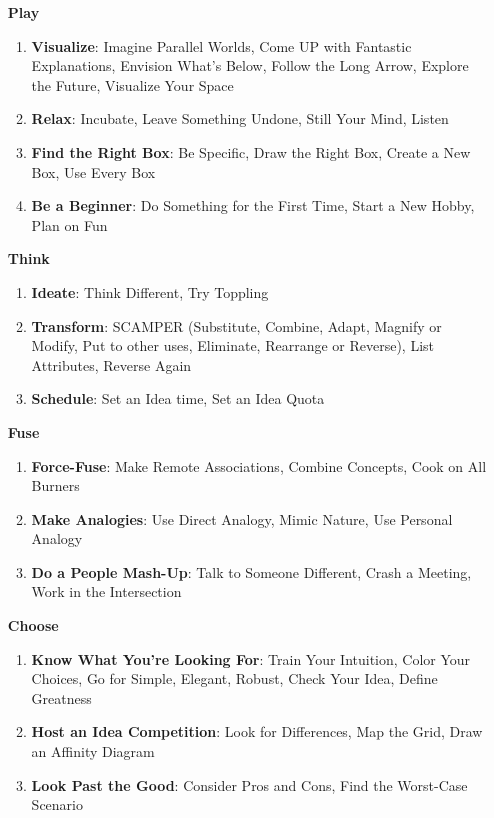 \documentclass[11pt, oneside]{article}   	%
\begin{document}
\begin{enumerate}
\begin{enumerate}
	\end{enumerate}
\item[\textbf{\huge Play}]
	\begin{enumerate}
	\item \textbf{Visualize}: Imagine Parallel Worlds, Come UP with Fantastic Explanations, Envision What's Below, Follow the Long Arrow, Explore the Future, Visualize Your Space
	\item \textbf{Relax}: Incubate, Leave Something Undone, Still Your Mind, Listen 
	\item \textbf{Find the Right Box}: Be Specific, Draw the Right Box, Create a New Box, Use Every Box
	\item \textbf{Be a Beginner}: Do Something for the First Time, Start a New Hobby, Plan on Fun
	\end{enumerate}
\item[\textbf{\huge Think}]
	\begin{enumerate}
	\item \textbf{Ideate}: Think Different, Try Toppling 
	\item \textbf{Transform}: SCAMPER (Substitute, Combine, Adapt, Magnify or Modify, Put to other uses, Eliminate, Rearrange or Reverse), List Attributes, Reverse Again
	\item \textbf{Schedule}: Set an Idea time, Set an Idea Quota
	\end{enumerate}
\item[\textbf{\huge Fuse}]
	\begin{enumerate}
	\item \textbf{Force-Fuse}: Make Remote Associations, Combine Concepts, Cook on All Burners
	\item \textbf{Make Analogies}: Use Direct Analogy, Mimic Nature, Use Personal Analogy
	\item \textbf{Do a People Mash-Up}: Talk to Someone Different, Crash a Meeting, Work in the Intersection
	\end{enumerate}
\item[\textbf{\huge Choose }]
	\begin{enumerate}
	\item \textbf{Know What You're Looking For}: Train Your Intuition, Color Your Choices, Go for Simple, Elegant, Robust, Check Your Idea, Define Greatness
	\item \textbf{Host an Idea Competition}: Look for Differences, Map the Grid, Draw an Affinity Diagram
	\item \textbf{Look Past the Good}: Consider Pros and Cons, Find the Worst-Case Scenario

\end{enumerate}
\end{enumerate}
\end{document}
